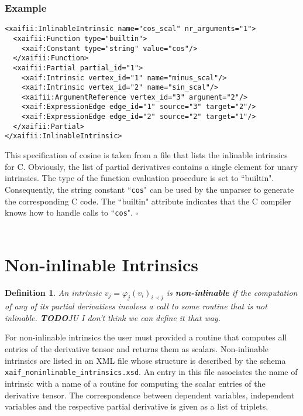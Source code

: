 \documentclass{book}
\newcommand{\todo}{{\bf TODO}}
\newtheorem{Def}{Definition}
\begin{document}
\subsubsection{Example}
\begin{verbatim}
<xaifii:InlinableIntrinsic name="cos_scal" nr_arguments="1">
  <xaifii:Function type="builtin">
    <xaif:Constant type="string" value="cos"/>
  </xaifii:Function>
  <xaifii:Partial partial_id="1">
    <xaif:Intrinsic vertex_id="1" name="minus_scal"/>
    <xaif:Intrinsic vertex_id="2" name="sin_scal"/>
    <xaifii:ArgumentReference vertex_id="3" argument="2"/>
    <xaif:ExpressionEdge edge_id="1" source="3" target="2"/>
    <xaif:ExpressionEdge edge_id="2" source="2" target="1"/>
  </xaifii:Partial>
</xaifii:InlinableIntrinsic>
\end{verbatim}
This specification of cosine is taken from a file that lists
the inlinable intrinsics for C.
Obviously, the list of partial derivatives contains a single element for
unary intrinsics. 
The type of the function evaluation procedure is set to ``builtin".
Consequently, the string constant ``{\tt cos}" can be used by the unparser
to generate the corresponding C code. The ``builtin" attribute indicates
that the C compiler knows how to handle calls to ``{\tt cos}". $\square$ \\ 
\\


\section{Non-inlinable Intrinsics}
\label{sec:NonInlinableIntrinsics}

\begin{Def} \label{def:noninlinable_intrinsic}
An intrinsic $v_j = \varphi_j(v_i)_{i \prec j}$ 
is {\bf non-inlinable} if the computation of any of its partial 
derivatives involves a call to some routine that is not inlinable.
\todo JU I don't think we can define it that way.
\end{Def}

For non-inlinable intrinsics
the user must provided a routine that computes all entries of
the derivative tensor and returns them as scalars. 
Non-inlinable intrinsics are listed in an XML file whose structure
is described by the schema {\tt xaif\_noninlinable\_intrinsics.xsd}.
An entry in this file associates the name of intrinsic with a name
of a routine for computing the scalar entries of the derivative tensor.
The correspondence between dependent variables, independent variables
and the respective partial derivative is given as a list of triplets.
\end{document}
